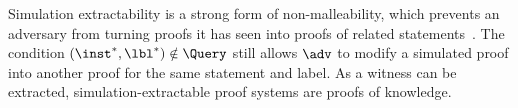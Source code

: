 Simulation extractability is a strong form of
non-malleability, which prevents an adversary from turning proofs it has seen
into proofs of related statements~\cite{AC:Groth06}. The condition $(\inst^*, \lbl^*) \notin \Query$ still allows $\adv$ to modify a
simulated proof into another proof for the same statement and label. As a
witness can be extracted, simulation-extractable proof systems are proofs of
knowledge.
